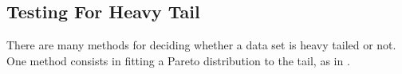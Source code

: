 %
%
%
%
%
%
%

\subsection{Testing For Heavy Tail}
There are many methods for deciding whether a
data set is heavy tailed or not. One method
consists in fitting a Pareto distribution to the
tail, as in .

